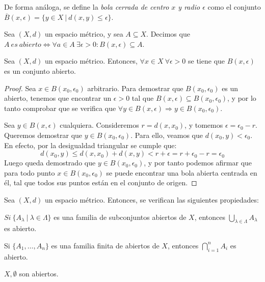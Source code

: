 \begin{ndef}
De forma análoga, se define la \emph{bola cerrada de centro $x$ y radio $\epsilon$} como el conjunto $\overline{B}(x,\epsilon) = \{y\in X \ | \ d(x,y)\leq \epsilon \}$.
\end{ndef}



\begin{ndef}
Sea $(X,d)$ un espacio métrico, y sea $A\subseteq X$. Decimos que \mbox{$A\ es\ abierto \iff \forall a \in A\ \exists \epsilon > 0: B(x,\epsilon) \subseteq A$}.
\end{ndef}



\begin{nprop}
Sea $(X,d)$ un espacio métrico. Entonces, $\forall x \in X \ \forall \epsilon > 0$ se tiene que $B(x,\epsilon)$ es un conjunto abierto.
\end{nprop}

\begin{proof}

Sea $x \in B(x_0,\epsilon_0) $ arbitrario. Para demostrar que $B(x_0,\epsilon_0)$ es un abierto, tenemos que encontrar un $\epsilon > 0$ tal que $B(x,\epsilon) \subseteq B(x_0,\epsilon_0)  $, y por lo tanto comprobar que se verifica que $\forall y \in B(x,\epsilon) \Rightarrow y \in B(x_0,\epsilon_0).$

Sea $y \in B(x, \epsilon )$ cualquiera. Consideremos $r = d(x, x_0)$, y tomemos $\epsilon = \epsilon_0 - r$. Queremos demostrar que $y \in B(x_0, \epsilon_0)$. Para ello, veamos que $d(x_0, y) < \epsilon_0$. En efecto, por la desigualdad triangular se cumple que: $$d(x_0, y) \leq d(x,x_0) + d(x,y) < r + \epsilon = r + \epsilon_0 - r = \epsilon_0 $$
Luego queda demostrado que $y \in B(x_0, \epsilon_0)$, y por tanto podemos afirmar que para todo punto $x \in B(x_0, \epsilon_0)$ se puede encontrar una bola abierta centrada en él, tal que todos sus puntos están en el conjunto de origen.
\end{proof}



\begin{nprop}
Sea $(X,d)$ un espacio métrico. Entonces, se verifican las siguientes propiedades:

\begin{nlist}
\item $Si\ \{A_\lambda \ | \ \lambda \in \Lambda \}$ es una familia de subconjuntos abiertos de $X$, entonces $\displaystyle \bigcup_{\lambda \in \Lambda} A_\lambda$ es abierto.

\item Si $\{A_1,\dots, A_n\}$ es una familia finita de abiertos de $X$, entonces $\displaystyle \bigcap_{i=1}^n A_i$ es abierto.

\item $X,\emptyset$ son abiertos.
\end{nlist}

\end{nprop}



